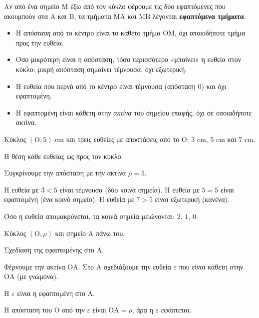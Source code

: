 Αν από ένα σημείο $\mathrm{Μ}$ έξω από τον κύκλο φέρουμε τις δύο εφαπτόμενες που ακουμπούν στα $\mathrm{Α}$ και $\mathrm{Β}$, τα τμήματα $\mathrm{ΜΑ}$ και $\mathrm{ΜΒ}$ λέγονται \textbf{εφαπτόμενα τμήματα}.

\begin{prosoxi}
\begin{itemize}[leftmargin=1.2em,itemsep=0.3ex,topsep=2pt]
\item Η \emph{απόσταση} από το κέντρο είναι το κάθετο τμήμα $\mathrm{ΟΜ}$, όχι οποιοδήποτε τμήμα προς την ευθεία.
\item Όσο μικρότερη είναι η απόσταση, τόσο περισσότερο «μπαίνει» η ευθεία στον κύκλο: μικρή απόσταση σημαίνει τέμνουσα, όχι εξωτερική.
\item Η ευθεία που περνά από το κέντρο είναι τέμνουσα (απόσταση $0$) και όχι εφαπτομένη.
\item Η εφαπτομένη είναι κάθετη στην \emph{ακτίνα} του σημείου επαφής, όχι σε οποιαδήποτε ακτίνα.
\end{itemize}
\end{prosoxi}


\tixero Κύκλος $(\mathrm{Ο},5)$ cm και τρεις ευθείες με αποστάσεις από το $\mathrm{Ο}$: $3$ cm, $5$ cm και $7$ cm.\par
\tithelo Η θέση κάθε ευθείας ως προς τον κύκλο.\par
\possindeo Συγκρίνουμε την απόσταση με την ακτίνα $\rho=5$.\par
\apantisi Η ευθεία με $3<5$ είναι τέμνουσα (δύο κοινά σημεία). Η ευθεία με $5=5$ είναι εφαπτομένη (ένα κοινό σημείο). Η ευθεία με $7>5$ είναι εξωτερική (κανένα).\par
\elegxos Όσο η ευθεία απομακρύνεται, τα κοινά σημεία μειώνονται: $2$, $1$, $0$.

\tixero Κύκλος $(\mathrm{Ο},\rho)$ και σημείο $\mathrm{Α}$ πάνω του.\par
\tithelo Σχεδίαση της εφαπτομένης στο $\mathrm{Α}$.\par
\possindeo Φέρνουμε την ακτίνα $\mathrm{ΟΑ}$. Στο $\mathrm{Α}$ σχεδιάζουμε την ευθεία $\varepsilon$ που είναι κάθετη στην $\mathrm{ΟΑ}$ (με γνώμονα).\par
\apantisi Η $\varepsilon$ είναι η εφαπτομένη στο $\mathrm{Α}$.\par
\elegxos Η απόσταση του $\mathrm{Ο}$ από την $\varepsilon$ είναι $\mathrm{ΟΑ}=\rho$, άρα η $\varepsilon$ εφάπτεται.

